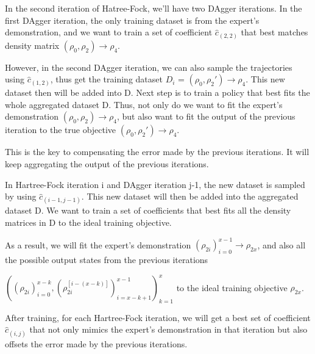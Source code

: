 \documentclass[twoside]{article}
\begin{document}
In the second iteration of Hatree-Fock, we'll have two DAgger iterations. In the first DAgger iteration, the only training dataset is from the expert's demonstration, and we want to train a set of coefficient  $\hat{c}_{(2,2)}$ that best matches density matrix $(\rho_0,\rho_2) \rightarrow \rho_4$.

However, in the second DAgger iteration, we can also sample the trajectories using $\hat{c}_{(1,2)}$, thus get the training dataset $D_i$ = $(\rho_0, \rho_2') \rightarrow \rho_4$. This new dataset then will be added into D.
Next step is to train a policy that best fits the whole aggregated dataset D. Thus, not only do we want to fit the expert's demonstration $(\rho_0, \rho_2) \rightarrow \rho_4$, but also want to fit the output of the previous iteration to the true objective $ (\rho_0,\rho_{2}') \rightarrow \rho_4$. 


This is the key to compensating the error made by the previous iterations. It will keep aggregating the output of the previous iterations.





In Hartree-Fock iteration i and DAgger iteration j-1, the new dataset
is sampled by using $\hat{c}_{(i-1,j-1)}$. This new dataset will then be added into the aggregated dataset D. We want to train a set of coefficients that best fits all the density matrices in D to the ideal training objective.


As a result, we will fit the expert's demonstration $(\rho_{2i})_{i=0}^{x-1} \rightarrow \rho_{2x}$, and also all the possible output states from the previous iterations 

$((\rho_{2i})_{i=0}^{x-k} ,(\rho_{2i}^{[i-(x-k)]})^{x-1}_{i=x-k+1})_{k=1}^{x}$  
to the ideal training objective $\rho_{2x}$.
%

After training, for each Hartree-Fock iteration, we will get a best set of coefficient $\hat{c}_{(i,j)}$ that not only mimics the expert's demonstration in that iteration but also offsets the error made by the previous iterations.
\end{document}
